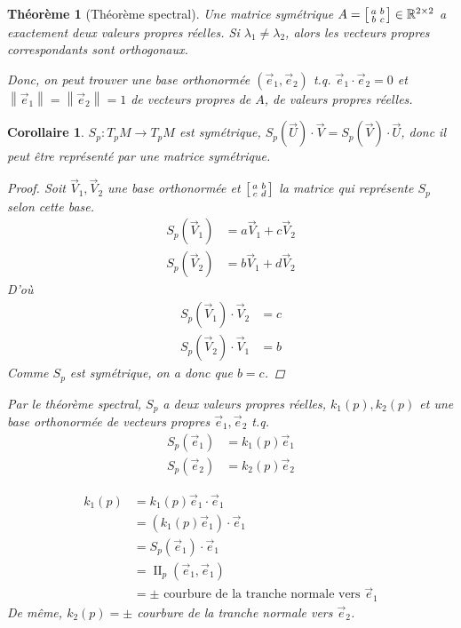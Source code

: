 \documentclass{report}
\newtheorem*{thm}{Th\'eor\`eme}
\newtheorem*{coro}{Corollaire}
\theoremstyle{definition}
\theoremstyle{remark}
\def\RR{\mathbb{R}}
\def\dff{\operatorname{II}}
\newcommand*{\norme}[1]{\left\|#1\right\|}
\begin{document}
	\begin{thm}[Th\'eor\`eme spectral]
		Une matrice sym\'etrique $A=\begin{bsmallmatrix}
			a&b\\b&c
		\end{bsmallmatrix}\in\RR^{2\times2}$ a exactement deux valeurs propres r\'eelles. Si $\lambda_1\neq\lambda_2$, alors les vecteurs propres correspondants sont orthogonaux.

		Donc, on peut trouver une base orthonorm\'ee $(\vec e_1,\vec e_2)$ t.q. $\vec e_1\cdot\vec e_2=0$ et $\norme{\vec e_1} = \norme{\vec e_2} = 1$ de vecteurs propres de $A$, de valeurs propres r\'eelles.
	\end{thm}

	\begin{coro}
		$S_p : T_pM\to T_pM$ est sym\'etrique, $S_p(\vec U)\cdot\vec V = S_p(\vec V)\cdot\vec U$, donc il peut \^etre repr\'esent\'e par une matrice sym\'etrique.

		\begin{proof}
			Soit $\vec V_1,\vec V_2$ une base orthonorm\'ee et $\begin{bsmallmatrix}
				a&b\\c&d
			\end{bsmallmatrix}$ la matrice qui repr\'esente $S_p$ selon cette base.
			\begin{align*}
				S_p(\vec V_1)&= a\vec V_1+c\vec V_2\\
				S_p(\vec V_2)&= b\vec V_1+d\vec V_2
			\end{align*}
			D'o\`u
			\begin{align*}
				S_p(\vec V_1)\cdot\vec V_2&= c\\
				S_p(\vec V_2)\cdot\vec V_1&= b
			\end{align*}
			Comme $S_p$ est sym\'etrique, on a donc que $b=c$.
		\end{proof}

		Par le th\'eor\`eme spectral, $S_p$ a deux valeurs propres r\'eelles, $k_1(p),k_2(p)$ et une base orthonorm\'ee de vecteurs propres $\vec e_1,\vec e_2$ t.q.
		\begin{align*}
			S_p(\vec e_1)&= k_1(p)\vec e_1\\
			S_p(\vec e_2)&= k_2(p)\vec e_2
		\end{align*}

		\begin{align*}
			k_1(p)&= k_1(p) \vec e_1 \cdot \vec e_1\\
			&= (k_1(p) \vec e_1) \cdot \vec e_1\\
			&= S_p(\vec e_1)\cdot\vec e_1\\
			&= \dff_p(\vec e_1,\vec e_1)\\
			&= \pm \text{ courbure de la tranche normale vers } \vec e_1
		\end{align*}
		De m\^eme, $k_2(p)=\pm$ courbure de la tranche normale vers $\vec e_2$.
	\end{coro}
\end{document}

